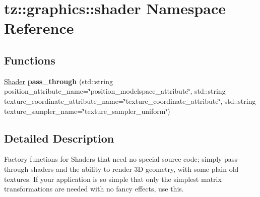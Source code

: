 \hypertarget{namespacetz_1_1graphics_1_1shader}{}\section{tz\+:\+:graphics\+:\+:shader Namespace Reference}
\label{namespacetz_1_1graphics_1_1shader}
\subsection*{Functions}
\begin{DoxyCompactItemize}
\item 
\mbox{\label{namespacetz_1_1graphics_1_1shader_a43ad94b340d47ed1ce9c10c026a7cac5}} 
\mbox{\hyperlink{class_shader}{Shader}} {\bfseries pass\+\_\+through} (std\+::string position\+\_\+attribute\+\_\+name=\char`\"{}position\+\_\+modelspace\+\_\+attribute\char`\"{}, std\+::string texture\+\_\+coordinate\+\_\+attribute\+\_\+name=\char`\"{}texture\+\_\+coordinate\+\_\+attribute\char`\"{}, std\+::string texture\+\_\+sampler\+\_\+name=\char`\"{}texture\+\_\+sampler\+\_\+uniform\char`\"{})
\end{DoxyCompactItemize}


\subsection{Detailed Description}
Factory functions for Shaders that need no special source code; simply pass-\/through shaders and the ability to render 3D geometry, with some plain old textures. If your application is so simple that only the simplest matrix transformations are needed with no fancy effects, use this. 